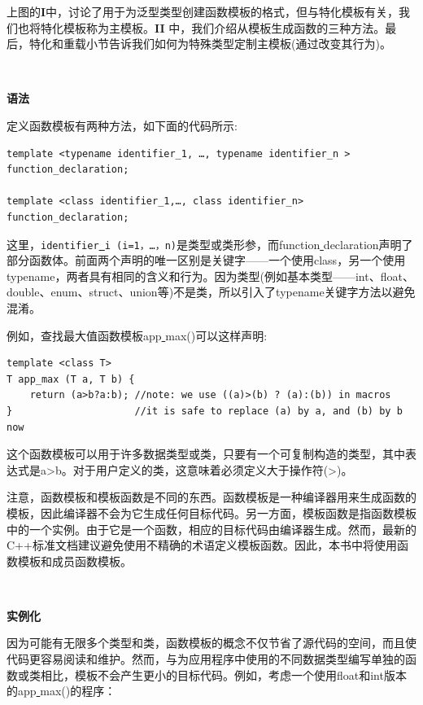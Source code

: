 上图的\textbf{I}中，讨论了用于为泛型类型创建函数模板的格式，但与特化模板有关，我们也将特化模板称为主模板。\textbf{II }中，我们介绍从模板生成函数的三种方法。最后，特化和重载小节告诉我们如何为特殊类型定制主模板(通过改变其行为)。 \par

\noindent\textbf{}\ \par
\textbf{语法} \ \par
定义函数模板有两种方法，如下面的代码所示: \par

\begin{lstlisting}[caption={}]
template <typename identifier_1, …, typename identifier_n >
function_declaration;

template <class identifier_1,…, class identifier_n>
function_declaration;
\end{lstlisting}

这里，\texttt{identifier\underline{ }i (i=1，…，n)}是类型或类形参，而function\underline{ }declaration声明了部分函数体。前面两个声明的唯一区别是关键字——一个使用class，另一个使用typename，两者具有相同的含义和行为。因为类型(例如基本类型——int、float、double、enum、struct、union等)不是类，所以引入了typename关键字方法以避免混淆。 \par
例如，查找最大值函数模板app\underline{ }max()可以这样声明: \par

\begin{lstlisting}[caption={}]
template <class T>
T app_max (T a, T b) {
	return (a>b?a:b); //note: we use ((a)>(b) ? (a):(b)) in macros
}                     //it is safe to replace (a) by a, and (b) by b now
\end{lstlisting}

这个函数模板可以用于许多数据类型或类，只要有一个可复制构造的类型，其中表达式是a>b。对于用户定义的类，这意味着必须定义大于操作符(>)。 \par
注意，函数模板和模板函数是不同的东西。函数模板是一种编译器用来生成函数的模板，因此编译器不会为它生成任何目标代码。另一方面，模板函数是指函数模板中的一个实例。由于它是一个函数，相应的目标代码由编译器生成。然而，最新的C++标准文档建议避免使用不精确的术语定义模板函数。因此，本书中将使用函数模板和成员函数模板。 \par

\noindent\textbf{}\ \par
\textbf{实例化} \ \par
因为可能有无限多个类型和类，函数模板的概念不仅节省了源代码的空间，而且使代码更容易阅读和维护。然而，与为应用程序中使用的不同数据类型编写单独的函数或类相比，模板不会产生更小的目标代码。例如，考虑一个使用float和int版本的app\underline{ }max()的程序： \par

